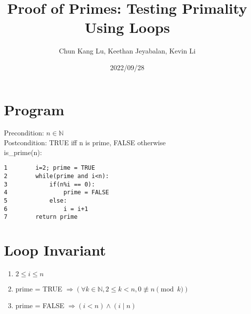 \documentclass{article}
\title{Proof of Primes: Testing Primality Using Loops}
\author{Chun Kang Lu, Keethan Jeyabalan, Kevin Li}
\date{2022/09/28}
\begin{document}
	\maketitle
	\flushleft
	\section*{Program}
	Precondition: \(n\in \mathbb{N} \) \\ 
	Postcondition: TRUE iff n is prime, FALSE otherwise\\
	is\_prime(n): \\
	\begin{verbatim}
1        i=2; prime = TRUE
2        while(prime and i<n):
3            if(n%i == 0):
4                prime = FALSE
5            else:
6                i = i+1
7        return prime
	\end{verbatim}
	\section{Loop Invariant}
	\begin{enumerate}[label=(\alph*)]
		\item \(2 \leq i \leq n\)
		\item prime = TRUE \(\Longrightarrow(\forall k \in \mathbb{N}, 2 \leq k < n, 0 \not\equiv n \pmod k)\)
		\item prime = FALSE \(\Longrightarrow (i < n) \land (i\mid n)\)
	\end{enumerate}
\end{document}
